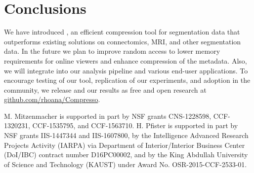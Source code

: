\section{Conclusions} \label{sec:c}
%
%
%
We have introduced \appName, an efficient compression tool for segmentation data that outperforms existing solutions on connectomics, MRI, and other segmentation data. 
In the future we plan to improve random access to lower memory requirements for online viewers and enhance compression of the metadata.
Also, we will integrate \appName into our analysis pipeline and various end-user applications. 
To encourage testing of our tool, replication of our experiments, and adoption in the community, we release \appName and our results as free and open research at \href{github.com/rhoana/Compresso}{github.com/rhoana/Compresso}. 

\smallskip

{\small M. Mitzenmacher is supported in part by NSF grants CNS-1228598, CCF-1320231, CCF-1535795, and CCF-1563710. H. Pfister is supported in part by NSF grants IIS-1447344 and IIS-1607800, by the Intelligence Advanced Research Projects Activity (IARPA) via Department of Interior/Interior Business Center (DoI/IBC) contract number D16PC00002, and by the King Abdullah University of Science and Technology (KAUST) under Award No. OSR-2015-CCF-2533-01.}
